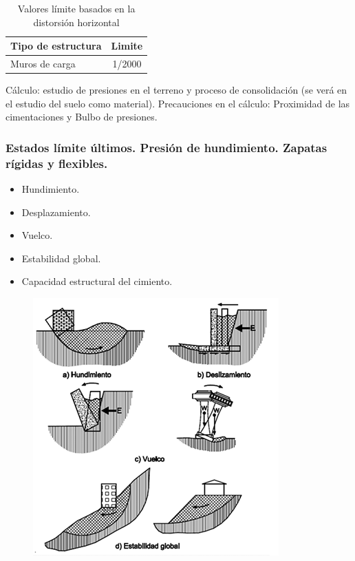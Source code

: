 \begin{table}[H]
    \centering
    \begin{tabular}{p{6cm}|c}
         \hline
         \textbf{Tipo de estructura} & \textbf{Limite} \\
         \hline
         Muros de carga & 1/2000 \\
         \hline
    \end{tabular}
    \caption{Valores límite basados en la distorsión horizontal}
\end{table}

Cálculo: estudio de presiones en el terreno y proceso de consolidación (se verá en el estudio del suelo como material). Precauciones en el cálculo: Proximidad de las cimentaciones y Bulbo de presiones.

\subsubsection{Estados límite últimos. Presión de hundimiento. Zapatas rígidas y flexibles.}
\begin{itemize}
    \item Hundimiento.
    \item Desplazamiento.
    \item Vuelco.
    \item Estabilidad global.
    \item Capacidad estructural del cimiento.
\end{itemize}

\begin{figure}[H]
    \centering
    \includegraphics[width=0.75\linewidth]{Imagenes/Cimentaciones superficiales - Estados limite uultimos.png}
\end{figure}

